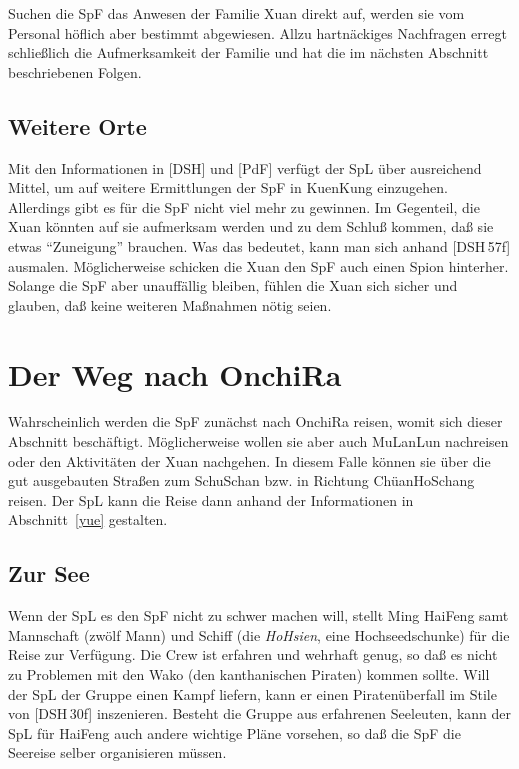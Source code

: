\documentclass[
a4paper,
twoside,
DIV=calc,
BCOR=4mm,
fontsize=9pt,
twocolumn=on,
titlepage=on,
parskip=half
]{scrartcl}
\begin{document}
Suchen die SpF das Anwesen der Familie Xuan direkt auf, werden sie vom
Personal höflich aber bestimmt abgewiesen. Allzu hartnäckiges
Nachfragen erregt schließlich die Aufmerksamkeit der Familie und hat
die im nächsten Abschnitt beschriebenen Folgen.

\subsection{Weitere Orte}

Mit den Informationen in [DSH] und [PdF] verfügt der SpL über
ausreichend Mittel, um auf weitere Ermittlungen der SpF in KuenKung
einzugehen. Allerdings gibt es für die SpF nicht viel mehr zu
gewinnen. Im Gegenteil, die Xuan könnten auf sie aufmerksam werden
und zu dem Schluß kommen, daß sie etwas "`Zuneigung"' brauchen. Was
das bedeutet, kann man sich anhand [DSH\,57f] ausmalen. Möglicherweise
schicken die Xuan den SpF auch einen Spion hinterher. Solange die SpF
aber unauffällig bleiben, fühlen die Xuan sich sicher und glauben,
daß keine weiteren Maßnahmen nötig seien.

\section{Der Weg nach OnchiRa}

Wahrscheinlich werden die SpF zunächst nach OnchiRa reisen, womit sich
dieser Abschnitt beschäftigt. Möglicherweise wollen sie aber auch
MuLanLun nachreisen oder den Aktivitäten der Xuan nachgehen. In diesem
Falle können sie über die gut ausgebauten Straßen zum SchuSchan
bzw. in Richtung ChüanHoSchang reisen. Der SpL kann die Reise dann
anhand der Informationen in Abschnitt~\ref{yue} gestalten.

\subsection{Zur See}

Wenn der SpL es den SpF nicht zu schwer machen will, stellt Ming
HaiFeng samt Mannschaft (zwölf Mann) und Schiff (die \emph{HoHsien}, eine
Hochseedschunke) für die Reise zur Verfügung. Die Crew ist erfahren
und wehrhaft genug, so daß es nicht zu Problemen mit den Wako (den
kanthanischen Piraten) kommen sollte. Will der SpL der Gruppe einen
Kampf liefern, kann er einen Piratenüberfall im Stile von [DSH\,30f]
inszenieren. Besteht die Gruppe aus erfahrenen Seeleuten, kann der SpL
für HaiFeng auch andere wichtige Pläne vorsehen, so daß die SpF die
Seereise selber organisieren müssen.
\end{document}
